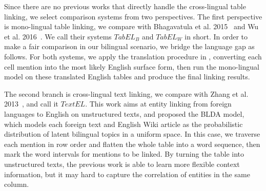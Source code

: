 Since there are no previous works that directly handle the cross-lingual table linking,
we select comparison systems from two perspectives.
The first perspective is mono-lingual table linking,
we compare with Bhagavatula et al. 2015~
and Wu et al. 2016~.
We call their systems $TabEL_B$ and $TabEL_W$ in short.
In order to make a fair comparison in our bilingual scenario, we bridge the language gap as follows.
For both systems, we apply the translation procedure in ,
converting each cell mention into the most likely English surface form,
then run the mono-lingual model on these translated English tables and produce the final linking results.

The second branch is cross-lingual text linking, we compare with Zhang et al. 2013~,
and call it $TextEL$.
This work aims at entity linking from foreign languages to English on unstructured texts,
and proposed the BLDA model, which models each foreign text and English Wiki article
as the probabilistic distribution of latent bilingual topics in a uniform space.
In this case, we traverse each mention in row order and flatten the whole table into a word sequence,
then mark the word intervals for mentions to be linked. 
By turning the table into unstructured texts, the previous work is able to learn 
more flexible context information, but it may hard to capture the correlation of entities
in the same column.

